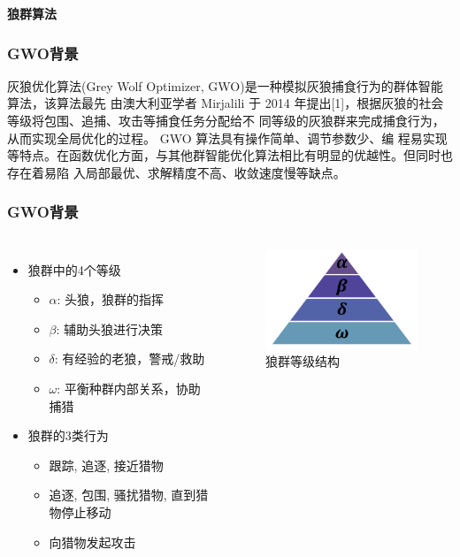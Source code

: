 \begin{frame}
\newcommand{\song}{\setCJKfamilyfont{song}}
\newcommand{\xiaoer}{\fontsize{18pt}{18pt}\selectfont}
	\begin{center}
	{\song\xiaoer\textbf{狼群算法}}
	\end{center}
\end{frame}

\begin{frame}
	\frametitle{GWO背景}
	灰狼优化算法(Grey Wolf Optimizer, GWO)是一种模拟灰狼捕食行为的群体智能算法，该算法最先
	由澳大利亚学者 Mirjalili 于 2014 年提出[1]，根据灰狼的社会等级将包围、追捕、攻击等捕食任务分配给不
	同等级的灰狼群来完成捕食行为，从而实现全局优化的过程。 GWO 算法具有操作简单、调节参数少、编
	程易实现等特点。在函数优化方面，与其他群智能优化算法相比有明显的优越性。但同时也存在着易陷
	入局部最优、求解精度不高、收敛速度慢等缺点。
\end{frame}


\begin{frame}
	\frametitle{GWO背景}
	\begin{columns}
		\begin{itemize}
			\item {狼群中的4个等级}
				\begin{itemize}
					\item {$\alpha$: 头狼，狼群的指挥}
					\item {$\beta$: 辅助头狼进行决策}
					\item {$\delta$: 有经验的老狼，警戒/救助}
					\item {$\omega$: 平衡种群内部关系，协助捕猎}
				\end{itemize}
			\item {狼群的3类行为}
				\begin{itemize}
					\item {跟踪, 追逐, 接近猎物}
					\item {追逐, 包围, 骚扰猎物, 直到猎物停止移动}
					\item {向猎物发起攻击}
				\end{itemize}
		\end{itemize}
		\begin{figure}[htbp]
			\centering
			\includegraphics[width=6cm]{pic/wolf1.png}
			\caption{狼群等级结构}
		\end{figure}
	\end{columns}
\end{frame}


